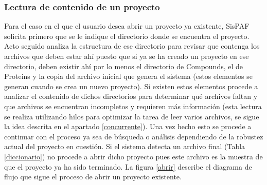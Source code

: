 \subsubsection{Lectura de contenido de un proyecto}
\noindent Para el caso en el que el usuario desea abrir un proyecto ya existente, SisPAF solicita primero que se le indique el directorio donde se encuentra el proyecto. Acto seguido analiza la estructura de ese directorio para revisar que contenga los archivos que deben estar ahí puesto que si ya se ha creado un proyecto en ese directorio, deben existir ahí por lo menos el directorio de Compounds, el de Proteins y la copia del archivo inicial que genera el sistema (estos elementos se generan cuando se crea un nuevo proyecto). Si existen estos elementos procede a analizar el contenido de dichos directorios para determinar qué archivos faltan y que archivos se encuentran incompletos y requieren más información (esta lectura se realiza utilizando hilos para optimizar la tarea de leer varios archivos, se sigue la idea descrita en el apartado \ref{concurrente}). Una vez hecho esto se procede a continuar con el proceso ya sea de búsqueda o análisis dependiendo de la robustez actual del proyecto en cuestión. Si el sistema detecta un archivo final (Tabla \ref{diccionario}) no procede a abrir dicho proyecto pues este archivo es la muestra de que el proyecto ya ha sido terminado. La figura \ref{abrir} describe el diagrama de flujo que sigue el proceso de abrir un proyecto existente.

